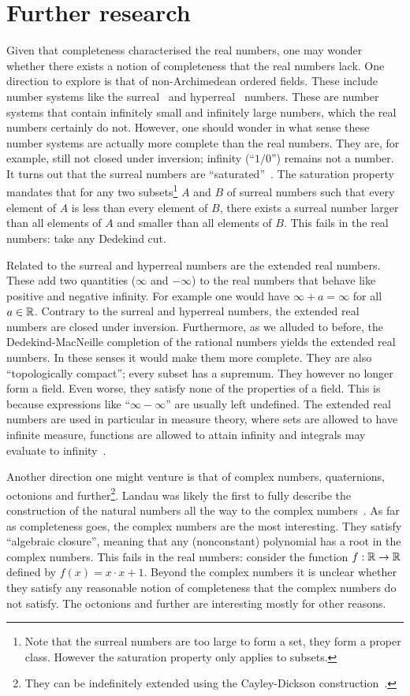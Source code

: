 \documentclass[../main.tex]{subfiles}
\begin{document}
\section{Further research}\label{sec:the_real_numbers:further_research}
Given that completeness characterised the real numbers, one may wonder wheth\-er there exists a notion of completeness that the real numbers lack. One direction to explore is that of non-Archimedean ordered fields. These include number systems like the surreal~\cite{Conway1976} and hyperreal~\cite{Goldblatt1998} numbers. These are number systems that contain infinitely small and infinitely large numbers, which the real numbers certainly do not. However, one should wonder in what sense these number systems are actually more complete than the real numbers. They are, for example, still not closed under inversion; infinity (``$1/0$'') remains not a number. It turns out that the surreal numbers are ``saturated''~\cite{Michael1963}. The saturation property mandates that for any two subsets\footnote{Note that the surreal numbers are too large to form a set, they form a proper class. However the saturation property only applies to subsets.} $A$ and $B$ of surreal numbers such that every element of $A$ is less than every element of $B$, there exists a surreal number larger than all elements of $A$ and smaller than all elements of $B$. This fails in the real numbers: take any Dedekind cut.

Related to the surreal and hyperreal numbers are the extended real numbers. These add two quantities ($\infty$ and $-\infty$) to the real numbers that behave like positive and negative infinity. For example one would have $\infty+a=\infty$ for all $a\in\mathbb{R}$. Contrary to the surreal and hyperreal numbers, the extended real numbers are closed under inversion. Furthermore, as we alluded to before, the Dedekind-MacNeille completion of the rational numbers yields the extended real numbers. In these senses it would make them more complete. They are also ``topologically compact''; every subset has a supremum. They however no longer form a field. Even worse, they satisfy none of the properties of a field. This is because expressions like ``$\infty-\infty$'' are usually left undefined. The extended real numbers are used in particular in measure theory, where sets are allowed to have infinite measure, functions are allowed to attain infinity and integrals may evaluate to infinity~\cite{Veraar2022}.

Another direction one might venture is that of complex numbers, quaternions, octonions and further\footnote{They can be indefinitely extended using the Cayley-Dickson construction~\cite{Dickson1919}.}. Landau was likely the first to fully describe the construction of the natural numbers all the way to the complex numbers~\cite{Landau1930}. As far as completeness goes, the complex numbers are the most interesting. They satisfy ``algebraic closure'', meaning that any (nonconstant) polynomial has a root in the complex numbers. This fails in the real numbers: consider the function $f:\mathbb{R}\to\mathbb{R}$ defined by $f(x)=x\cdot x+1$. Beyond the complex numbers it is unclear whether they satisfy any reasonable notion of completeness that the complex numbers do not satisfy. The octonions and further are interesting mostly for other reasons.
\end{document}
